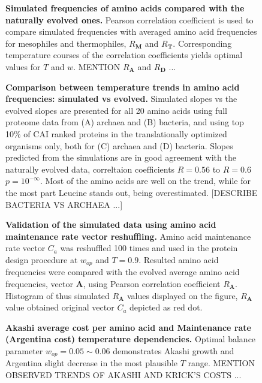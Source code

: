 \documentclass[10pt,letterpaper]{article}
\begin{document}
\begin{figure}[h!]
\caption{
{\bf Simulated frequencies of amino acids compared with the naturally evolved ones.} Pearson correlation coefficient is used to compare simulated frequencies with averaged amino acid frequencies for mesophiles and thermophiles, $R_{\mathbf{M}}$ and $R_{\mathbf{T}}$. Corresponding temperature courses of the correlation coefficients yields optimal values for $T$ and $\mathit{w}$. MENTION $R_{\mathbf{A}}$ and $R_{\mathbf{D}}$ ...
}
\label{fig:fig4}
\end{figure}




\begin{figure}[h!]
\caption{
{\bf Comparison between temperature trends in amino acid frequencies: simulated vs evolved.} Simulated slopes vs the evolved slopes are presented for all 20 amino acids using full proteome data from (A) archaea and (B) bacteria, and using top 10\% of CAI ranked proteins in the translationally optimized organisms only, both for (C) archaea and (D) bacteria. Slopes predicted from the simulations are in good agreement with the naturally evolved data, correltaion coefficients $R=0.56$ to $R=0.6$ $p=10^{-\infty}$. Most of the amino acids are well on the trend, while for the most part Leucine stands out, being overestimated.
 [DESCRIBE BACTERIA VS ARCHAEA ...]
}
\label{fig:fig5}
\end{figure}



\begin{figure}[h!]
\caption{
{\bf Validation of the simulated data using amino acid maintenance rate vector reshuffling.} Amino acid maintenance rate vector $C_{a}$ was reshuffled 100 times and used in the protein design procedure at $\mathit{w}_{op}$ and $T=0.9$. Resulted amino acid frequencies were compared with the evolved average amino acid frequencies, vector $\mathbf{A}$, using Pearson correlation coefficient $R_{\mathbf{A}}$. Histogram of thus simulated $R_{\mathbf{A}}$ values displayed on the figure, $R_{\mathbf{A}}$ value obtained original vector $C_{a}$ depicted as red dot.
}
\label{fig:fig6}
\end{figure}



\begin{figure}[h!]
\caption{
{\bf Akashi average cost per amino acid and Maintenance rate (Argentina cost) temperature dependencies.} Optimal balance parameter $\mathit{w}_{op}=0.05\sim0.06$ demonstrates Akashi growth and Argentina slight decrease in the most plausible $T$ range. MENTION OBSERVED TRENDS OF AKASHI AND KRICK'S COSTS ...
}
\label{fig:fig7}
\end{figure}
\end{document}
